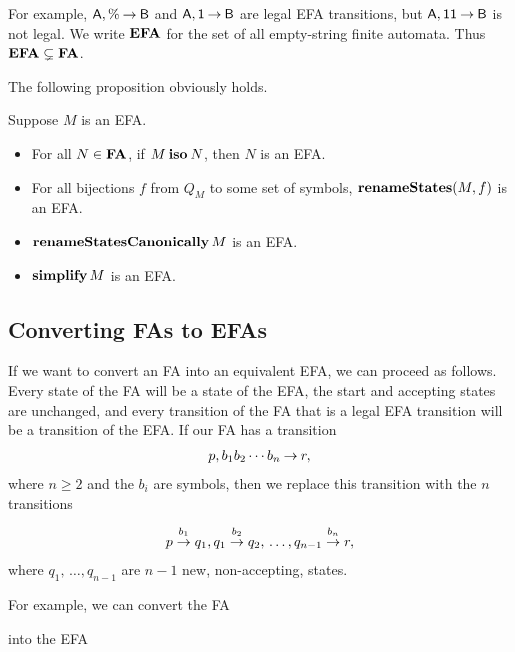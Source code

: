 For example, $\mathsf{A},\%\mathbin{\to}\mathsf{B}$ and $\mathsf{A},\mathsf{1}\mathbin{\to}\mathsf{B}$ are legal EFA
transitions, but $\mathsf{A},\mathsf{1}\mathsf{1}\mathbin{\to}\mathsf{B}$ is not legal.  We write
%
%
$\mathbf{EFA}$ for the set of all empty-string finite automata.  Thus
$\mathbf{EFA}\subsetneq\mathbf{FA}$.

The following proposition obviously holds.

\begin{proposition}
Suppose $M$ is an EFA.
\begin{itemize}
\item For all $N\in\mathbf{FA}$, if $M\mathbin{\mathbf{iso}} N$, then $N$ is an EFA.

\item For all bijections $f$ from $Q_M$ to some set of symbols,
  $\mathbf{renameStates}(M, f)$ is an EFA.

\item $\mathbf{renameStatesCanonically}\,M$ is an EFA.

\item $\mathbf{simplify}\,M$ is an EFA.
\end{itemize}
\end{proposition}

\subsection{Converting FAs to EFAs}

%
%
If we want to convert an FA into an equivalent EFA, we can proceed as
follows.  Every state of the FA will be a state of the EFA, the start
and accepting states are unchanged, and every transition of the FA
that is a legal EFA transition will be a transition
of the EFA.  If our FA has a transition
\begin{gather*}
p, b_1b_2\cdots b_n\mathbin{\to} r,
\end{gather*}
where $n\geq 2$ and the $b_i$ are symbols, then we replace this
transition with the $n$ transitions
\begin{gather*}
p\stackrel{\strut b_1}{\rightarrow}q_1, q_1\stackrel{\strut b_2}{\rightarrow}q_2,\,\ldots, q_{n-1}\stackrel{\strut b_n}{\rightarrow}r,
\end{gather*}
where $q_1,\,\ldots,q_{n-1}$ are $n-1$ new, non-accepting, states.

For example, we can convert the FA
\begin{center}

\end{center}
into the EFA
\begin{center}

\end{center}

